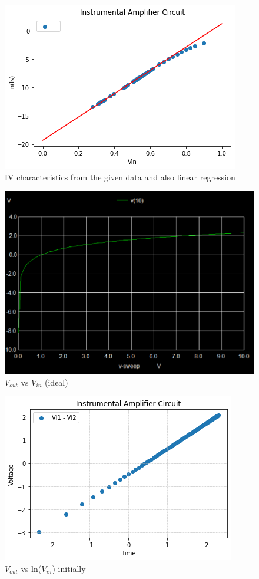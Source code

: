 \documentclass[12pt]{article}
\begin{document}
\begin{figure}[H]
\begin{center}
\includegraphics[scale = 0.8]{reg.png}
\caption{IV characteristics from the given data and also linear regression}
\end{center}
\end{figure}

\begin{figure}[H]
\begin{center}
\includegraphics[scale = 0.5]{i.png}
\caption{$V_{out}$ vs $V_{in}$ (ideal)}
\end{center}
\end{figure}

\begin{figure}[H]
\begin{center}
\includegraphics[scale = 0.8]{2.png}
\caption{$V_{out}$ vs ln($V_{in}$) initially}
\end{center}
\end{figure}
\end{document}
